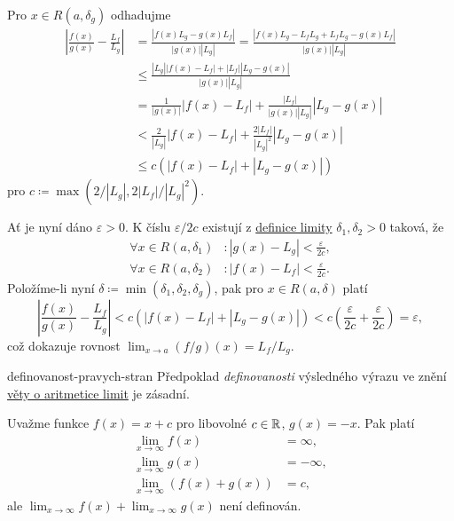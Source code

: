 \begin{thmproof}
 Pro $x \in R(a,\delta_g)$ odhadujme
 \begin{align*}
  \left| \frac{f(x)}{g(x)} - \frac{L_f}{L_g} \right| &= \frac{|f(x)L_g -
  g(x)L_f|}{|g(x)||L_g|} = \frac{|f(x) L_g - L_f L_g + L_f L_g -
  g(x)L_f|}{|g(x)| |L_g|}\\
  																									 & \leq \frac{|L_g| |f(x) -
  																									 L_f| + |L_f| |L_g -
  																									g(x)|}{|g(x)| |L_g|}\\
  																									 &= \frac{1}{|g(x)|}
  																									 |f(x) - L_f| +
  																									 \frac{|L_f|}{|g(x)|
  																									 |L_g|}|L_g - g(x)|\\
  																									 &< \frac{2}{|L_g|}|f(x) -
  																									 L_f| + \frac{2
  																									 |L_f|}{|L_g|^2}|L_g -
  																									 g(x)|\\
  																									 & \leq c(|f(x) - L_f| +
  																									 |L_g - g(x)|)
 \end{align*}
 pro $c \coloneqq \max(2 / |L_g|, 2|L_f|/|L_g|^2)$.

 Ať je nyní dáno $\varepsilon>0$. K číslu $\varepsilon / 2c$ existují z
 \hyperref[def:oboustranna-limita-funkce]{definice limity} $\delta_1,\delta_2>0$
 taková, že
 \begin{align*}
 	\forall x \in R(a,\delta_1)&: |g(x) - L_g| < \frac{\varepsilon}{2c},\\
 	\forall x \in R(a,\delta_2)&: |f(x) - L_f| < \frac{\varepsilon}{2c}.
 \end{align*}
 Položíme-li nyní $\delta \coloneqq \min(\delta_1,\delta_2,\delta_g)$, pak pro
 $x \in R(a,\delta)$ platí
 \[
  \left| \frac{f(x)}{g(x)} - \frac{L_f}{L_g} \right| < c (|f(x) - L_f| + |L_g -
  g(x)|) < c \left(\frac{\varepsilon}{2c} + \frac{\varepsilon}{2c}\right) =
  \varepsilon,
 \]
 což dokazuje rovnost $\lim_{x \to a} (f / g)(x) = L_f / L_g$.
\end{thmproof}

\begin{warning}{}{definovanost-pravych-stran}
 Předpoklad \emph{definovanosti} výsledného výrazu ve znění
 \hyperref[thm:aritmetika-limit-funkci]{věty o aritmetice limit} je zásadní.

 Uvažme funkce $f(x) = x + c$ pro libovolné $c \in \mathbb{R}$, $g(x) = -x$. Pak platí
 \begin{align*}
  \lim_{x \to \infty} f(x) &= \infty,\\
  \lim_{x \to \infty} g(x) &= -\infty,\\
  \lim_{x \to \infty} (f(x) + g(x)) &= c,
 \end{align*}
 ale $\lim_{x \to \infty} f(x) + \lim_{x \to \infty} g(x)$ není definován.
\end{warning}

